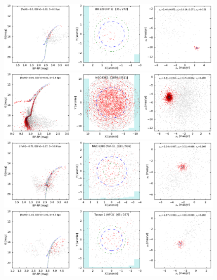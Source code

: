 \documentclass[usenatbib]{mnras}
\begin{document}
\clearpage\begin{figure}
\contcaption{}
\includegraphics{figs/HP_1_BH_229.pdf}
\includegraphics{figs/NGC_6362.pdf}
\includegraphics{figs/NGC_6380_Ton1.pdf}
\includegraphics{figs/Terzan_1_HP_2.pdf}
\end{figure}
\end{document}
